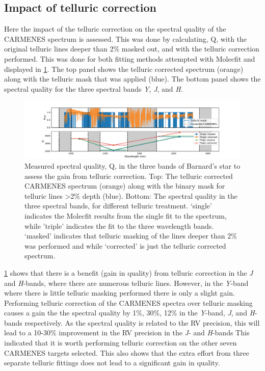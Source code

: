 \subsection{Impact of telluric correction}
\label{subsec:impact_telluric_correction}
Here the impact of the telluric correction on the spectral quality of the CARMENES spectrum is assessed.
This was done by calculating, Q, with the original telluric lines deeper than 2\% masked out, and with the telluric correction performed.
This was done for both fitting methods attempted with Molecfit and displayed in \cref{fig:band_qualityfromapplyingtelluriccorrection}.
The top panel shows the telluric corrected spectrum (orange) along with the telluric mask that was applied (blue).
The bottom panel shows the spectral quality for the three spectral bands \emph{Y}, \emph{J}, and \emph{H}.

\begin{figure}
    \centering
    \includegraphics[width=0.7\linewidth]{figures/information-content/Carmenes/Band_quality_from_applying_telluric_correction}
    \caption[Barnard's star spectral quality.]{Measured spectral quality, Q, in the three \nir{} bands of Barnard's star to assess the gain from telluric correction. 
        Top: The telluric corrected CARMENES spectrum (orange) along with the binary mask for telluric lines >2\% depth (blue). 
        Bottom: The spectral quality in the three spectral bands, for different telluric treatment. `single' indicates the Molecfit results from the single fit to the spectrum, while 'triple' indicates the fit to the three wavelength bands.
        `masked' indicates that telluric masking of the lines deeper than 2\% was performed and while `corrected' is just the telluric corrected spectrum.}
    \label{fig:band_qualityfromapplyingtelluriccorrection}
\end{figure}

\cref{fig:band_qualityfromapplyingtelluriccorrection} shows that there is a benefit (gain in quality) from telluric correction in the \emph{J} and \emph{H}-bands, where there are numerous telluric lines.
However, in the \emph{Y}-band where there is little telluric masking performed there is only a slight gain.
Performing telluric correction of the CARMENES spectra over telluric masking causes a gain the the spectral quality by 1\%, 30\%, 12\% in the \emph{Y}-band, \emph{J}, and \emph{H}-bands respectively.
As the spectral quality is related to the RV precision, this will lead to a 10-30\% improvement in the RV precision in the \emph{J}- and \emph{H}-bands
This indicated that it is worth performing telluric correction on the other seven {CARMENES} targets selected.
This also shows that the extra effort from three separate telluric fittings does not lead to a significant gain in quality.


